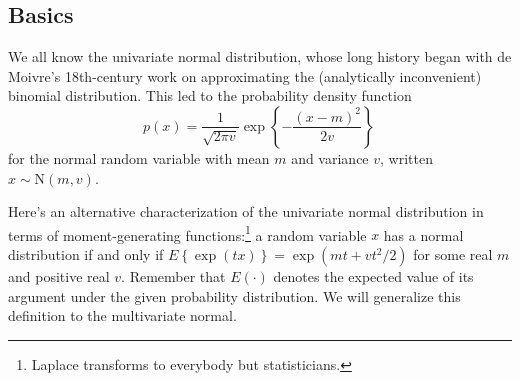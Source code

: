 \documentclass{mynotes}
\newcommand{\N}{\mbox{N}}
\begin{document}
\subsection{Basics}

We all know the univariate normal distribution, whose long history began with de Moivre's 18th-century work on approximating the (analytically inconvenient) binomial distribution.  This led to the probability density function
$$
p(x) = \frac{1}{\sqrt{2 \pi v}} \exp \left\{ - \frac{(x-m)^2}{2 v} \right\} \, 
$$
for the normal random variable with mean $m$ and variance $v$, written $x \sim \N(m, v)$.

Here's an alternative characterization of the univariate normal distribution in terms of moment-generating functions:\footnote{Laplace transforms to everybody but statisticians.} a random variable $x$ has a normal distribution if and only if $E \left\{ \exp(tx) \right\} = \exp(mt + v t^2 /2)$ for some real $m$ and positive real $v$.  Remember that $E(\cdot)$ denotes the expected value of its argument under the given probability distribution.  We will generalize this definition to the multivariate normal.
\end{document}
